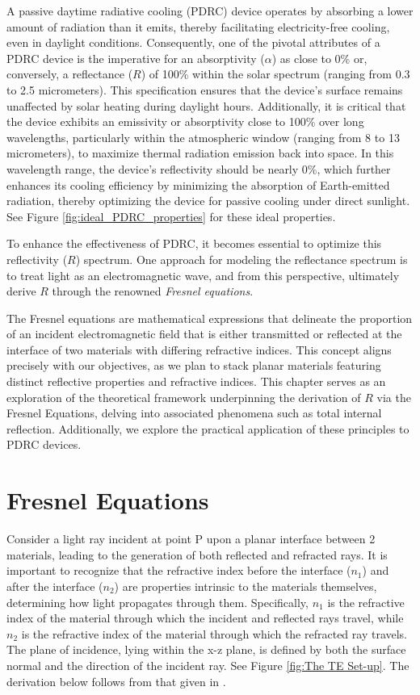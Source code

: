 A passive daytime radiative cooling (PDRC) device operates by absorbing a lower amount of radiation than it emits, thereby facilitating electricity-free cooling, even in daylight conditions. Consequently, one of the pivotal attributes of a PDRC device is the imperative for an absorptivity ($\alpha$) as close to 0\% or, conversely, a reflectance ($R$) of 100\% within the solar spectrum (ranging from 0.3 to 2.5 micrometers). This specification ensures that the device's surface remains unaffected by solar heating during daylight hours. Additionally, it is critical that the device exhibits an emissivity or absorptivity close to 100\% over long wavelengths, particularly within the atmospheric window (ranging from 8 to 13 micrometers), to maximize thermal radiation emission back into space. In this wavelength range, the device's reflectivity should be nearly 0\%, which further enhances its cooling efficiency by minimizing the absorption of Earth-emitted radiation, thereby optimizing the device for passive cooling under direct sunlight. See Figure \ref{fig:ideal_PDRC_properties} for these ideal properties.

To enhance the effectiveness of PDRC, it becomes essential to optimize this reflectivity ($R$) spectrum. One approach for modeling the reflectance spectrum is to treat light as an electromagnetic wave, and from this perspective, ultimately derive $R$ through the renowned \textit{Fresnel equations}.

The Fresnel equations are mathematical expressions that delineate the proportion of an incident electromagnetic field that is either transmitted or reflected at the interface of two materials with differing refractive indices. This concept aligns precisely with our objectives, as we plan to stack planar materials featuring distinct reflective properties and refractive indices. This chapter serves as an exploration of the theoretical framework underpinning the derivation of $R$ via the Fresnel Equations, delving into associated phenomena such as total internal reflection. Additionally, we explore the practical application of these principles to PDRC devices.


\section{Fresnel Equations}
Consider a light ray incident at point P upon a planar interface between 2 materials, leading to the generation of both reflected and refracted rays. It is important to recognize that the refractive index before the interface ($n_1$) and after the interface ($n_2$) are properties intrinsic to the materials themselves, determining how light propagates through them. Specifically, $n_1$ is the refractive index of the material through which the incident and reflected rays travel, while $n_2$ is the refractive index of the material through which the refracted ray travels. The plane of incidence, lying within the x-z plane, is defined by both the surface normal and the direction of the incident ray. See Figure \ref{fig:The TE Set-up}. The derivation below follows from that given in \cite{pedrotti_introduction_2007}.

